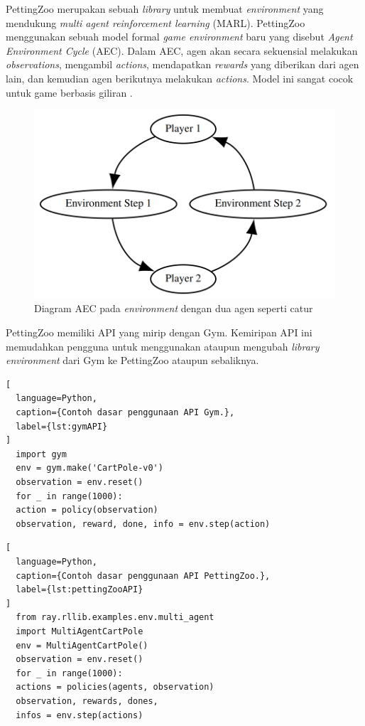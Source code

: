 PettingZoo merupakan sebuah \emph{library} untuk membuat \emph{environment} yang mendukung \emph{multi agent reinforcement learning} (MARL).
PettingZoo menggunakan sebuah model formal \emph{game environment} baru yang disebut \emph{Agent Environment Cycle} (AEC). Dalam AEC, agen akan secara sekuensial melakukan \emph{observations}, mengambil \emph{actions}, mendapatkan \emph{rewards} yang diberikan dari agen lain, dan kemudian agen berikutnya melakukan \emph{actions}.
Model ini sangat cocok untuk game berbasis giliran \citep{pettingZoo}.

\begin{figure}[H]
  \centering
    \includegraphics[scale=0.5]{gambar/actor_environment_cycle.png}
    \caption{Diagram AEC pada \emph{environment} dengan dua agen seperti catur}
    \label{fig:actorEnvironmentCycle}
\end{figure}

PettingZoo memiliki API yang mirip dengan Gym. Kemiripan API ini memudahkan pengguna untuk menggunakan ataupun mengubah \emph{library environment} dari Gym ke PettingZoo ataupun sebaliknya.

\begin{lstlisting}[
  language=Python,
  caption={Contoh dasar penggunaan API Gym.},
  label={lst:gymAPI}
]
  import gym
  env = gym.make('CartPole-v0')
  observation = env.reset()
  for _ in range(1000):
  action = policy(observation)
  observation, reward, done, info = env.step(action)
\end{lstlisting}

\begin{lstlisting}[
  language=Python,
  caption={Contoh dasar penggunaan API PettingZoo.},
  label={lst:pettingZooAPI}
]
  from ray.rllib.examples.env.multi_agent
  import MultiAgentCartPole
  env = MultiAgentCartPole()
  observation = env.reset()
  for _ in range(1000):
  actions = policies(agents, observation)
  observation, rewards, dones,
  infos = env.step(actions)
\end{lstlisting}